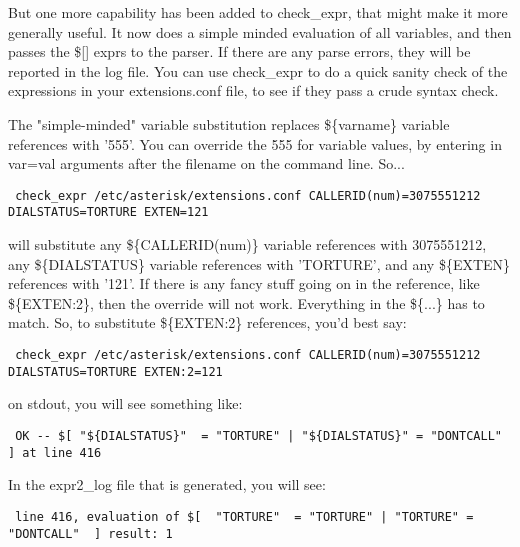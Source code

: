 But one more capability has been added to check\_expr, that might make
it more generally useful. It now does a simple minded evaluation of
all variables, and then passes the \$[] exprs to the parser. If there
are any parse errors, they will be reported in the log file. You can
use check\_expr to do a quick sanity check of the expressions in your
extensions.conf file, to see if they pass a crude syntax check.

The "simple-minded" variable substitution replaces \$\{varname\} variable
references with '555'. You can override the 555 for variable values,
by entering in var=val arguments after the filename on the command
line.  So...
\begin{astlisting}
\begin{verbatim}
 check_expr /etc/asterisk/extensions.conf CALLERID(num)=3075551212 DIALSTATUS=TORTURE EXTEN=121
\end{verbatim}
\end{astlisting}
will substitute any \$\{CALLERID(num)\} variable references with
3075551212, any \$\{DIALSTATUS\} variable references with 'TORTURE', and
any \$\{EXTEN\} references with '121'.  If there is any fancy stuff
going on in the reference, like \$\{EXTEN:2\}, then the override will
not work. Everything in the \$\{...\} has to match. So, to substitute
\$\{EXTEN:2\} references, you'd best say:
\begin{astlisting}
\begin{verbatim}
 check_expr /etc/asterisk/extensions.conf CALLERID(num)=3075551212 DIALSTATUS=TORTURE EXTEN:2=121
\end{verbatim}
\end{astlisting}
on stdout, you will see something like:

\begin{astlisting}
\begin{verbatim}
 OK -- $[ "${DIALSTATUS}"  = "TORTURE" | "${DIALSTATUS}" = "DONTCALL" ] at line 416
\end{verbatim}
\end{astlisting}

In the expr2\_log file that is generated, you will see:

\begin{astlisting}
\begin{verbatim}
 line 416, evaluation of $[  "TORTURE"  = "TORTURE" | "TORTURE" = "DONTCALL"  ] result: 1
\end{verbatim}
\end{astlisting}

